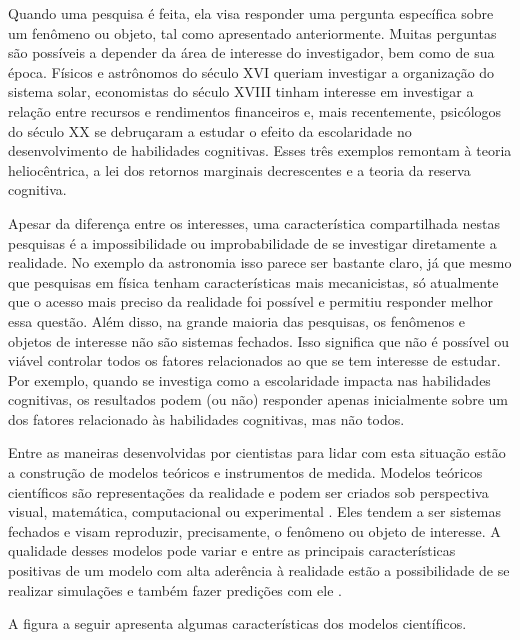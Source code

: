 \documentclass[
]{book}
\begin{document}
Quando uma pesquisa é feita, ela visa responder uma pergunta específica sobre um fenômeno ou objeto, tal como apresentado anteriormente. Muitas perguntas são possíveis a depender da área de interesse do investigador, bem como de sua época. Físicos e astrônomos do século XVI queriam investigar a organização do sistema solar, economistas do século XVIII tinham interesse em investigar a relação entre recursos e rendimentos financeiros e, mais recentemente, psicólogos do século XX se debruçaram a estudar o efeito da escolaridade no desenvolvimento de habilidades cognitivas. Esses três exemplos remontam à teoria heliocêntrica, a lei dos retornos marginais decrescentes e a teoria da reserva cognitiva.

Apesar da diferença entre os interesses, uma característica compartilhada nestas pesquisas é a impossibilidade ou improbabilidade de se investigar diretamente a realidade. No exemplo da astronomia isso parece ser bastante claro, já que mesmo que pesquisas em física tenham características mais mecanicistas, só atualmente que o acesso mais preciso da realidade foi possível e permitiu responder melhor essa questão. Além disso, na grande maioria das pesquisas, os fenômenos e objetos de interesse não são sistemas fechados. Isso significa que não é possível ou viável controlar todos os fatores relacionados ao que se tem interesse de estudar. Por exemplo, quando se investiga como a escolaridade impacta nas habilidades cognitivas, os resultados podem (ou não) responder apenas inicialmente sobre um dos fatores relacionado às habilidades cognitivas, mas não todos.

Entre as maneiras desenvolvidas por cientistas para lidar com esta situação estão a construção de modelos teóricos e instrumentos de medida. Modelos teóricos científicos são representações da realidade e podem ser criados sob perspectiva visual, matemática, computacional ou experimental \citep{Weisberg2013}. Eles tendem a ser sistemas fechados e visam reproduzir, precisamente, o fenômeno ou objeto de interesse. A qualidade desses modelos pode variar e entre as principais características positivas de um modelo com alta aderência à realidade estão a possibilidade de se realizar simulações e também fazer predições com ele \citep{Heidemann2016}.

A figura a seguir apresenta algumas características dos modelos científicos.
\end{document}

